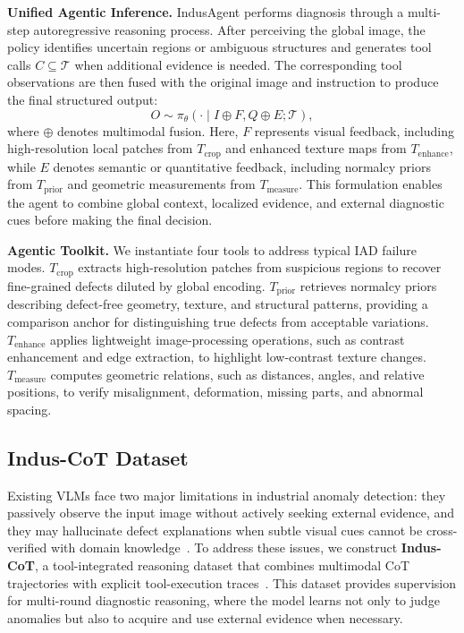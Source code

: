 \documentclass{article}
\begin{document}
\textbf{Unified Agentic Inference.} 
IndusAgent performs diagnosis through a multi-step autoregressive reasoning process. 
After perceiving the global image, the policy identifies uncertain regions or ambiguous structures and generates tool calls $C \subseteq \mathcal{T}$ when additional evidence is needed. 
The corresponding tool observations are then fused with the original image and instruction to produce the final structured output:
\begin{equation}
O \sim \pi_\theta(\cdot \mid I \oplus F, Q \oplus E; \mathcal{T}),
\end{equation}
where $\oplus$ denotes multimodal fusion. 
Here, $F$ represents visual feedback, including high-resolution local patches from $T_{\text{crop}}$ and enhanced texture maps from $T_{\text{enhance}}$, while $E$ denotes semantic or quantitative feedback, including normalcy priors from $T_{\text{prior}}$ and geometric measurements from $T_{\text{measure}}$. 
This formulation enables the agent to combine global context, localized evidence, and external diagnostic cues before making the final decision.

\textbf{Agentic Toolkit.}
We instantiate four tools to address typical IAD failure modes. $T_{\text{crop}}$ extracts high-resolution patches from suspicious regions to recover fine-grained defects diluted by global encoding. $T_{\text{prior}}$ retrieves normalcy priors describing defect-free geometry, texture, and structural patterns, providing a comparison anchor for distinguishing true defects from acceptable variations. $T_{\text{enhance}}$ applies lightweight image-processing operations, such as contrast enhancement and edge extraction, to highlight low-contrast texture changes. $T_{\text{measure}}$ computes geometric relations, such as distances, angles, and relative positions, to verify misalignment, deformation, missing parts, and abnormal spacing.

\subsection{Indus-CoT Dataset}
\label{sec:Training}

Existing VLMs face two major limitations in industrial anomaly detection: they passively observe the input image without actively seeking external evidence, and they may hallucinate defect explanations when subtle visual cues cannot be cross-verified with domain knowledge~\citep{driess2023palm, sun2024aligning}. 
To address these issues, we construct \textbf{Indus-CoT}, a tool-integrated reasoning dataset that combines multimodal CoT trajectories with explicit tool-execution traces~\citep{zhang2023multimodal, chen2023fireact}. 
This dataset provides supervision for multi-round diagnostic reasoning, where the model learns not only to judge anomalies but also to acquire and use external evidence when necessary.
\end{document}
